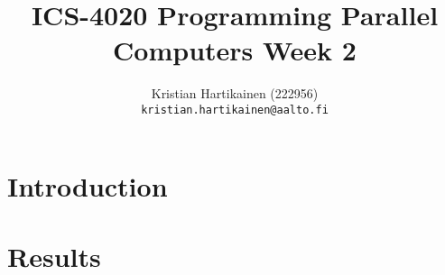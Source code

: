 \documentclass[a4paper,10pt]{article}
\title{ICS-4020 Programming Parallel Computers Week 2}
\author{Kristian Hartikainen (222956)\\
       {\tt kristian.hartikainen@aalto.fi}}
\begin{document}
\maketitle

\pagebreak



\section{Introduction}


\pagebreak
\section{Results}


\end{document}
